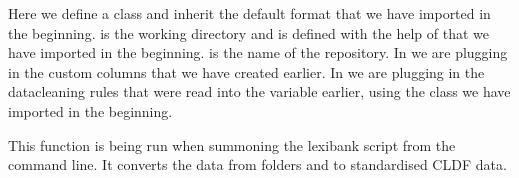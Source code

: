 \documentclass[letterpaper,10pt,english]{sphinxmanual}
\begin{document}
{{{{\begin{sphinxVerbatim}[commandchars=\\\{\}]
       
      
\end{sphinxVerbatim}

\sphinxAtStartPar
Here we define a class and inherit the default format  that we
have imported in the beginning.  is the working directory and is
defined with the help of  that we have imported in the beginning.
 is the name of the repository. In  we are plugging in
the custom columns that we have created earlier. In  we are
plugging in the data\sphinxhyphen{}cleaning rules that were read into the  variable
earlier, using the  class we have imported in the beginning.

\begin{sphinxVerbatim}[commandchars=\\\{\}]
  
\end{sphinxVerbatim}

\sphinxAtStartPar
This function is being run when summoning the lexibank script from the command
line. It converts the data from folders  and  to standardised
CLDF data.

}}}}
\end{document}
